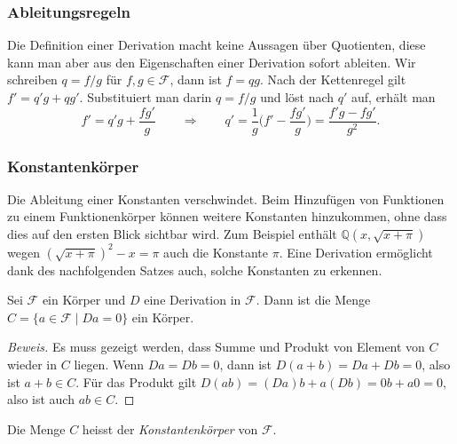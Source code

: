%
%
\subsubsection{Ableitungsregeln}
Die Definition einer Derivation macht keine Aussagen über Quotienten,
diese kann man aber aus den Eigenschaften einer Derivation sofort
ableiten.
Wir schreiben $q=f/g$ für $f,g\in\mathscr{F}$, dann ist $f=qg$.
Nach der Kettenregel gilt
\(
f'=q'g+qg'
\).
Substituiert man darin $q=f/g$ und löst nach $q'$ auf, erhält man
\[
f'=q'g+\frac{fg'}{g}
\qquad\Rightarrow\qquad
q'=\frac1{g}\biggl(f'-\frac{fg'}{g}\biggr)
=
\frac{f'g-fg'}{g^2}.
\]


%
%
\subsubsection{Konstantenkörper}
Die Ableitung einer Konstanten verschwindet.
Beim Hinzufügen von Funktionen zu einem Funktionenkörper können weitere
Konstanten hinzukommen, ohne dass dies auf den ersten Blick sichtbar wird.
Zum Beispiel enthält $\mathbb{Q}(x,\!\sqrt{x+\pi})$ wegen
$(\!\sqrt{x+\pi})^2-x=\pi$ auch die Konstante $\pi$.
Eine Derivation ermöglicht dank des nachfolgenden Satzes auch,
solche Konstanten zu erkennen.

\begin{satz}
Sei $\mathscr{F}$ ein Körper und $D$ eine Derivation in $\mathscr{F}$.
Dann ist die Menge $C=\{a\in\mathscr{F}\;|\;Da=0\}$ ein Körper.
\end{satz}

\begin{proof}[Beweis]
Es muss gezeigt werden, dass Summe und Produkt von Element von $C$ 
wieder in $C$ liegen.
Wenn $Da=Db=0$, dann ist $D(a+b)=Da+Db=0$, also ist $a+b\in C$.
Für das Produkt gilt $D(ab)=(Da)b+a(Db)=0b+a0=0$, also ist auch
$ab\in C$.
\end{proof}

Die Menge $C$ heisst der {\em Konstantenkörper} von $\mathscr{F}$.
%

%
%
